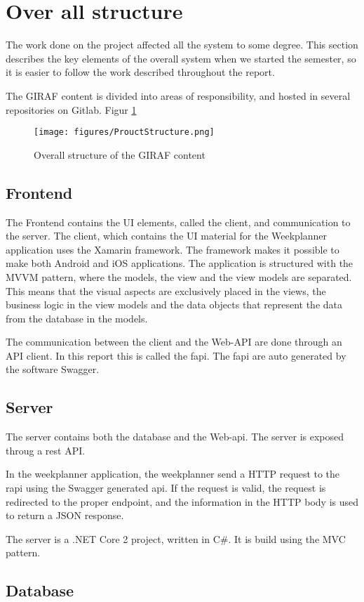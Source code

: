 \section{Over all structure}

The work done on the project affected all the system to some degree. This section describes the key elements of the overall system when we started the semester, so it is easier to follow the work described throughout the report. 

The GIRAF content is divided into areas of responsibility, and hosted in several repositories on Gitlab. Figur \ref{fig:ProductStructure}

\begin{figure}[H]
    \begin{center}
        \texttt{[image: figures/ProuctStructure.png]}
    \end{center}
    \caption{Overall structure of the GIRAF content}
    \label{fig:ProductStructure}
\end{figure}

\subsection{Frontend}
The Frontend contains the UI elements, called the client, and communication to the server. The client, which contains the UI material for the Weekplanner application uses the Xamarin framework. The framework makes it possible to make both Android and iOS applications. The application is structured with the MVVM pattern, where the models, the view and the view models are separated. This means that the visual aspects are exclusively placed in the views, the business logic in the view models and the data objects that represent the data from the database in the models.

The communication between the client and the Web-API are done through an API client. In this report this is called the \gls{fapi}. The \gls{fapi} are auto generated by the software Swagger.

\subsection{Server}
The server contains both the database and the Web-api. The server is exposed throug a rest API.


In the weekplanner application, the weekplanner send a HTTP request to the \gls{rapi} using the Swagger generated \gls{api}. If the request is valid, the request is redirected to the proper endpoint, and the information in the HTTP body is used to return a JSON response.

The server is a .NET Core 2 project, written in C\#. It is build using the MVC pattern.

\subsection{Database}

